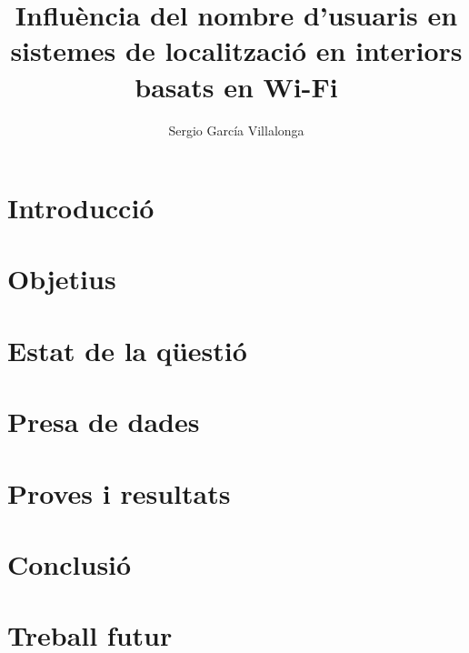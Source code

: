 \documentclass[a4paper, 10pt, twocolumn]{article}
\title{Influència del nombre d'usuaris en sistemes de localització en interiors basats en Wi-Fi}
\author{Sergio García Villalonga}
\begin{document}
\maketitle



\section{Introducció}

 
\section{Objetius}


\section{Estat de la qüestió}


\section{Presa de dades}


\section{Proves i resultats}


\section{Conclusió}


\section{Treball futur}





%
%
\end{document}
